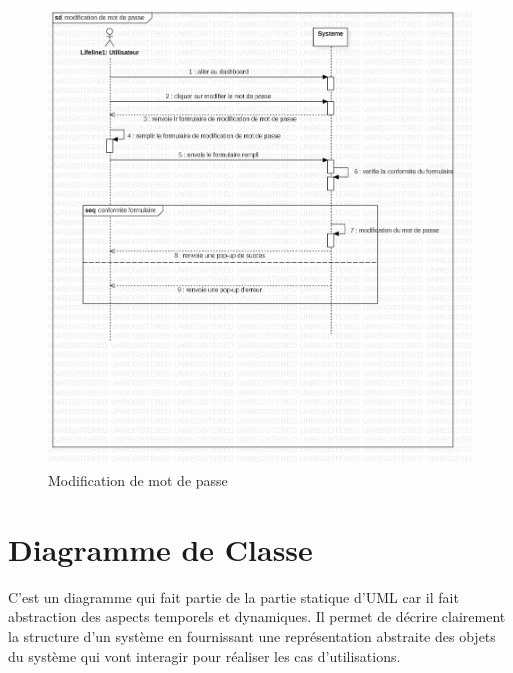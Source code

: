 \documentclass[11pt,a4paper]{report}
\begin{document}
\begin{enumerate}
\begin{center}
 \begin{figure}[H]
 \includegraphics[width=\linewidth]{img/jpg/safeprivacing-modif4.jpg}
 \caption{Modification de mot de passe}
 \label{fig:diagram5}
 \end{figure}
 \end{center}
 
 \end{enumerate}
 \newpage
 \section{Diagramme de Classe}
 
 C'est un diagramme qui fait partie de la partie statique d'UML car il fait abstraction des aspects temporels et dynamiques. Il permet de décrire clairement la structure d'un système en fournissant une représentation abstraite des objets du système qui vont interagir pour réaliser les cas d'utilisations.
\end{document}
